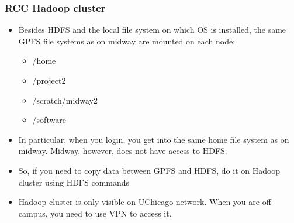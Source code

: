 \documentclass{beamer}
\begin{document}
\begin{frame}
  \frametitle{RCC Hadoop cluster}
  \begin{itemize}
  \item Besides HDFS and the local file system on which OS is installed, the same GPFS file systems as on midway are mounted on each node:
    \begin{itemize}
    \item {\color{mycolorcli}/home}
    \item {\color{mycolorcli}/project2}
    \item {\color{mycolorcli}/scratch/midway2}
    \item {\color{mycolorcli}/software}
    \end{itemize}
  \item In particular, when you login, you get into the same home file system as on midway. Midway, however, does not have access to HDFS.
  \item So, if you need to copy data between GPFS and HDFS, do it on Hadoop cluster using HDFS commands
  \item Hadoop cluster is only visible on UChicago network. When you are off-campus, you need to use VPN to access it.
  \end{itemize}
\end{frame}
\end{document}

